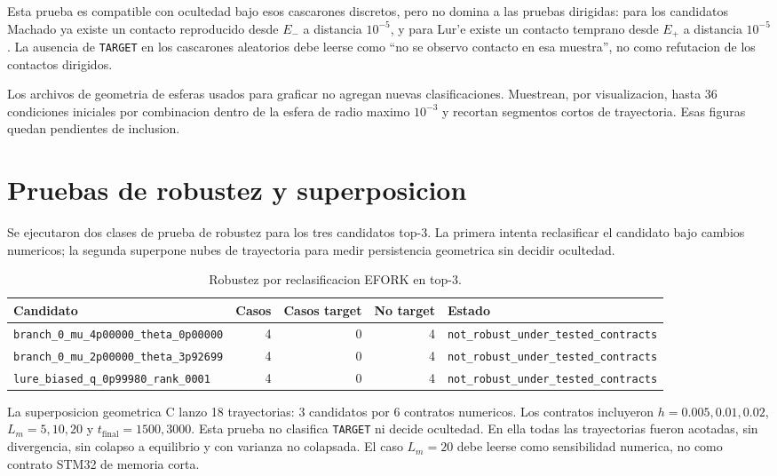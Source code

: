 \documentclass[11pt]{article}
\newcommand{\status}[1]{\texttt{\small #1}}
\newcommand{\target}{\texttt{TARGET}}
\newcommand{\Eplus}{E_+}
\newcommand{\Eminus}{E_-}
\begin{document}
Esta prueba es compatible con ocultedad bajo esos cascarones discretos, pero no
domina a las pruebas dirigidas: para los candidatos Machado ya existe un
contacto reproducido desde \(\Eminus\) a distancia \(10^{-5}\), y para Lur'e
existe un contacto temprano desde \(\Eplus\) a distancia \(10^{-5}\). La
ausencia de \target{} en los cascarones aleatorios debe leerse como ``no se
observo contacto en esa muestra'', no como refutacion de los contactos
dirigidos.

Los archivos de geometria de esferas usados para graficar no agregan nuevas
clasificaciones. Muestrean, por visualizacion, hasta 36 condiciones iniciales
por combinacion dentro de la esfera de radio maximo \(10^{-3}\) y recortan
segmentos cortos de trayectoria. Esas figuras quedan pendientes de inclusion.

\section{Pruebas de robustez y superposicion}

Se ejecutaron dos clases de prueba de robustez para los tres candidatos top-3.
La primera intenta reclasificar el candidato bajo cambios numericos; la segunda
superpone nubes de trayectoria para medir persistencia geometrica sin decidir
ocultedad.

\begin{table}[h]
\centering
\caption{Robustez por reclasificacion EFORK en top-3.}
\small
\begin{tabular}{lrrrl}
\toprule
Candidato & Casos & Casos target & No target & Estado \\
\midrule
\status{branch\_0\_mu\_4p00000\_theta\_0p00000} & 4 & 0 & 4 & \status{not\_robust\_under\_tested\_contracts} \\
\status{branch\_0\_mu\_2p00000\_theta\_3p92699} & 4 & 0 & 4 & \status{not\_robust\_under\_tested\_contracts} \\
\status{lure\_biased\_q\_0p99980\_rank\_0001} & 4 & 0 & 4 & \status{not\_robust\_under\_tested\_contracts} \\
\bottomrule
\end{tabular}
\end{table}

La superposicion geometrica C lanzo 18 trayectorias: 3 candidatos por 6
contratos numericos. Los contratos incluyeron \(h=0.005,0.01,0.02\),
\(L_m=5,10,20\) y \(t_{\mathrm{final}}=1500,3000\). Esta prueba no clasifica
\target{} ni decide ocultedad. En ella todas las trayectorias fueron acotadas,
sin divergencia, sin colapso a equilibrio y con varianza no colapsada. El caso
\(L_m=20\) debe leerse como sensibilidad numerica, no como contrato STM32 de
memoria corta.
\end{document}
